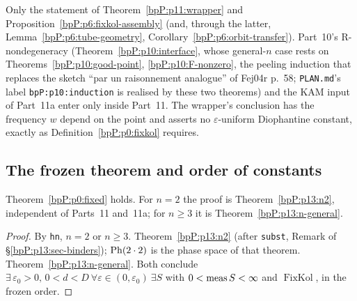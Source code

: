 \begin{remark}\label{bpP:p13:consumed}
Only the statement of Theorem~\ref{bpP:p11:wrapper} and Proposition~\ref{bpP:p6:fixkol-assembly} (and, through the latter, Lemma~\ref{bpP:p6:tube-geometry}, Corollary~\ref{bpP:p6:orbit-transfer}). Part~10's R-nondegeneracy (Theorem~\ref{bpP:p10:interface}, whose general-$n$ case rests on Theorems~\ref{bpP:p10:good-point}, \ref{bpP:p10:F-nonzero}, the peeling induction that replaces the sketch ``par un raisonnement analogue'' of Fej04r p.~58; \texttt{PLAN.md}'s label \texttt{bpP:p10:induction} is realised by these two theorems) and the KAM input of Part~11a enter only inside Part~11. The wrapper's conclusion has the frequency $w$ depend on the point and asserts no $\varepsilon$-uniform Diophantine constant, exactly as Definition~\ref{bpP:p0:fixkol} requires.
\end{remark}

\subsection{The frozen theorem and order of constants}\label{bpP:p13:sec-main}

\begin{theorem}\label{bpP:p13:fixed}
Theorem~\ref{bpP:p0:fixed} holds. For $n=2$ the proof is Theorem~\ref{bpP:p13:n2}, independent of Parts~11 and~11a; for $n\ge3$ it is Theorem~\ref{bpP:p13:n-general}.
\end{theorem}
\begin{proof}
\label{stepP:p13:fx-split} By \texttt{hn}, $n=2$ or $n\ge3$.
\label{stepP:p13:fx-2} Theorem~\ref{bpP:p13:n2} (after \texttt{subst}, Remark of \S\ref{bpP:p13:sec-binders}); $\mathrm{Ph}(2\cdot2)$ is the phase space of that theorem.
\label{stepP:p13:fx-n} Theorem~\ref{bpP:p13:n-general}. Both conclude $\exists\,\varepsilon_0>0,\,0<d<D\ \forall\varepsilon\in(0,\varepsilon_0)\ \exists S$ with $0<\operatorname{meas} S<\infty$ and $\operatorname{FixKol}$, in the frozen order.
\end{proof}


